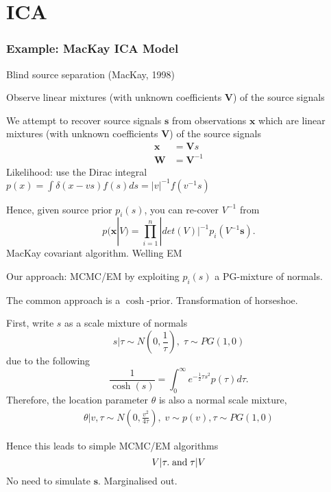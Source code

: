 \documentclass{beamer}
\newcommand{\bcol}[1]{{\color{blue}{#1}}}
\newcommand{\half}{ {\scriptstyle \frac{1}{2} }  }
\begin{document}
\section{ICA}
\begin{frame}
\frametitle{Example: MacKay ICA Model}
\footnotesize

Blind source separation (MacKay, 1998)

\vspace{0.1in} 

Observe linear mixtures (with unknown coefficients $\bm V$) of the source signals

\vspace{0.1in} 

We attempt to recover source signals $\bm s$ from observations $\bm x$ which are linear mixtures (with unknown coefficients $\bm V$) of the source signals
\begin{align*}
\bm x &= \bm Vs\\
\bm W &= \bm V^{-1}
\end{align*}
Likelihood: use the Dirac integral $ p( x) = \int \delta  ( x - v s ) f(s) d s = | v|^{-1} f( v^{-1} s ) $

\vspace{0.1in}

Hence, given source prior $p_i(s)$, you can re-cover $ V^{-1}$ from 
$$
p( \bm x |V ) = \prod_{i=1}^n | det ( V) |^{-1}  p_i ( V^{-1}  \bm s  ) .
$$
MacKay covariant algorithm. Welling EM 

\vspace{0.1in}

Our approach: MCMC/EM by exploiting $p_i(s) $ a PG-mixture of normals. 

\end{frame}

\begin{frame}
\begin{center}
\bcol{ MacKay $ \cosh ( s ) $ model }
\end{center}
\footnotesize

The common approach is a $ \cosh $-prior. Transformation of horseshoe. 

\vspace{0.1in}

First, write $s$ as a scale mixture of normals
\begin{equation}
s|\tau \sim N \left (0, \frac{1}{\tau} \right ),\; \tau \sim PG(1,0)
\end{equation}
due to the following 
\begin{equation}
\frac{1}{\cosh(s)} = \int_{0}^{\infty} e^{-\half \tau s^2}p(\tau) d\tau.
\end{equation}
Therefore, the location parameter $\theta$ is also a normal scale mixture,
\begin{align}
\theta|v,\tau \sim N\left(0, \frac{v^2}{4\tau}\right),\; v\sim p(v), \tau\sim PG(1,0)
\end{align}

Hence this leads to simple MCMC/EM algorithms
$$
V | \tau. \; {\rm and} \; \tau | V 
$$
No need to simulate $ \bm s $. Marginalised out. 
\end{frame}
\end{document}
